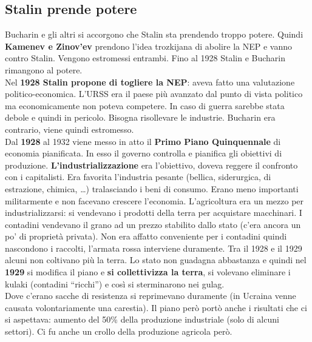 \subsection{Stalin prende potere}
Bucharin e gli altri si accorgono che Stalin sta prendendo troppo potere. Quindi \textbf{Kamenev e 
Zinov'ev} prendono l'idea trozkijana di abolire la NEP e vanno contro Stalin. Vengono estromessi 
entrambi. Fino al 1928 Stalin e Bucharin rimangono al potere.\\
Nel \textbf{1928 Stalin propone di togliere la NEP}: aveva fatto una valutazione politico-economica.
L'URSS era il paese più avanzato dal punto di vista politico ma economicamente non poteva competere.
In caso di guerra sarebbe stata debole e quindi in pericolo. Bisogna risollevare le industrie.
Bucharin era contrario, viene quindi estromesso.\\
Dal \textbf{1928} al 1932 viene messo in atto il \textbf{Primo Piano Quinquennale} di economia 
pianificata. In esso il governo controlla e pianifica gli obiettivi di produzione. 
\textbf{L'industrializzazione} era l'obiettivo, doveva reggere il confronto con i capitalisti. Era
favorita l'industria pesante (bellica, siderurgica, di estrazione, chimica, \ldots) tralasciando i
beni di consumo. Erano meno importanti militarmente e non facevano crescere l'economia. L'agricoltura
era un mezzo per industrializzarsi: si vendevano i prodotti della terra per acquistare macchinari.
I contadini vendevano il grano ad un prezzo stabilito dallo stato (c'era ancora un po' di proprietà
privata). Non era affatto conveniente per i contadini quindi nascondono i raccolti, l'armata rossa
interviene duramente. Tra il 1928 e il 1929 alcuni non coltivano più la terra. Lo stato non guadagna
abbastanza e quindi nel \textbf{1929} si modifica il piano e \textbf{si collettivizza la terra},
si volevano eliminare i kulaki (contadini ``ricchi'') e così si sterminarono nei gulag.\\
Dove c'erano sacche di resistenza si reprimevano duramente (in Ucraina venne causata volontariamente
una carestia). Il piano però portò anche i risultati che ci si aspettava: aumento del 50\% della
produzione industriale (solo di alcuni settori). Ci fu anche un crollo della produzione agricola 
però.
